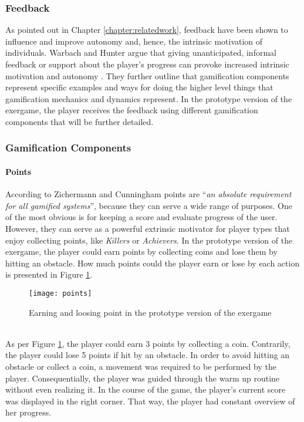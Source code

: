 \subsubsection{Feedback}
As pointed out in Chapter \ref{chapter:relatedwork}, feedback have been shown to influence and improve autonomy and, hence, the intrinsic motivation of individuals. %
Warbach and Hunter argue that giving unanticipated, informal feedback or support about the player's progress can provoke increased intrinsic motivation and autonomy \cite{werbach2012win}. They further outline that gamification components represent specific examples and ways for doing the higher level things that gamification mechanics and dynamics represent. In the prototype version of the exergame, the player receives the feedback using different gamification components that will be further detailed.

\subsubsection{Gamification Components}
\paragraph{Points}
According to Zichermann and Cunningham \cite{zichermann2011gamification} points are ``\textit{an absolute requirement for all gamified systems}'', because they can serve a wide range of purposes. One of the most obvious is for keeping a score and evaluate progress of the user. However, they can serve as a powerful extrinsic motivator for player types that enjoy collecting points, like \textit{Killers} or \textit{Achievers}. In the prototype version of the exergame, the player could earn points by collecting coins and lose them by hitting an obstacle. How much points could the player earn or lose by each action is presented in Figure \ref{fig:points}.\\
\begin{figure}[h]
    \centering
    \texttt{[image: points]}
    \caption{Earning and loosing point in the prototype version of the exergame}
    \label{fig:points}
\end{figure}\\
As per Figure \ref{fig:points}, the player could earn 3 points by collecting a coin. Contrarily, the player could lose 5 points if hit by an obstacle. In order to avoid hitting an obstacle or collect a coin, a movement was required to be performed by the player. Consequentially, the player was guided through the warm up routine without even realizing it. In the course of the game, the player's current score was displayed in the right corner. That way, the player had constant overview of her progress.  
